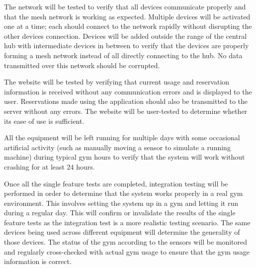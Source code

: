 \documentclass[PPFS.tex]{template/subfiles}
\begin{document}
The network will be tested to verify that all devices communicate properly and that the mesh network is working as expected. Multiple devices will be activated one at a time; each should connect to the network rapidly without disrupting the other devices connection. Devices will be added outside the range of the central hub with intermediate devices in between to verify that the devices are properly forming a mesh network instead of all directly connecting to the hub. No data transmitted over this network should be corrupted.

The website will be tested by verifying that current usage and reservation information is received without any communication errors and is displayed to the user. Reservations made using the application should also be transmitted to the server without any errors. The website will be user-tested to determine whether its ease of use is sufficient.

All the equipment will be left running for multiple days with some occasional artificial activity (such as manually moving a sensor to simulate a running machine) during typical gym hours to verify that the system will work without crashing for at least 24 hours.

Once all the single feature tests are completed, integration testing will be performed in order to determine that the system works properly in a real gym environment. This involves setting the system up in a gym and letting it run during a regular day. This will confirm or invalidate the results of the single feature tests as the integration test is a more realistic testing scenario. The same devices being used across different equipment will determine the generality of those devices. The status of the gym according to the sensors will be monitored and regularly cross-checked with actual gym usage to ensure that the gym usage information is correct.
\end{document}
